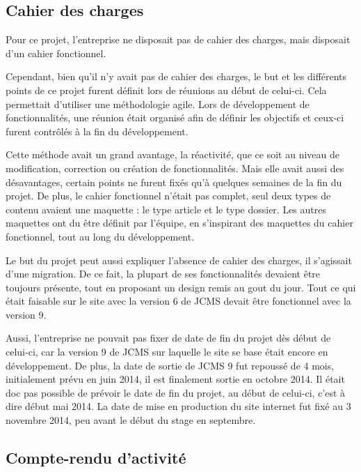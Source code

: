 \documentclass[12pt,a4paper]{article}
\begin{document}
\subsection{Cahier des charges}
Pour ce projet, l'entreprise ne disposait pas de cahier des charges, mais disposait d'un cahier fonctionnel.\par
Cependant, bien qu'il n'y avait pas de cahier des charges, le but et les différents points de ce projet furent définit lors de réunions au début de celui-ci. Cela permettait d'utiliser une méthodologie agile. Lors de développement de fonctionnalités, une réunion était organisé afin de définir les objectifs et ceux-ci furent contrôlés à la fin du développement.\par 
Cette méthode avait un grand avantage, la réactivité, que ce soit au niveau de modification, correction ou création de fonctionnalités. Mais elle avait aussi des désavantages, certain points ne furent fixés qu'à quelques semaines de la fin du projet. De plus, le cahier fonctionnel n'était pas complet, seul deux types de contenu avaient une maquette : le type article et le type dossier. Les autres maquettes ont du être définit par l'équipe, en s'inspirant des maquettes du cahier fonctionnel, tout au long du développement. \par 
Le but du projet peut aussi expliquer l'absence de cahier des charges, il s'agissait d'une migration. De ce fait, la plupart de ses fonctionnalités devaient être toujours présente, tout en proposant un design remis au gout du jour. Tout ce qui était faisable sur le site avec la version 6 de JCMS devait être fonctionnel avec la version 9.\par 
Aussi, l'entreprise ne pouvait pas fixer de date de fin du projet dès début de celui-ci, car la version 9 de JCMS sur laquelle le site se base était encore en développement. De plus, la date de sortie de JCMS 9 fut repoussé de 4 mois, initialement prévu en juin 2014, il est finalement sortie en octobre 2014. Il était doc pas possible de prévoir le date de fin du projet, au début de celui-ci, c'est à dire début mai 2014. La date de mise en production du site internet fut fixé au 3 novembre 2014, peu avant le début du stage en septembre.\par
\newpage
\subsection{Compte-rendu d'activité}
\end{document}
